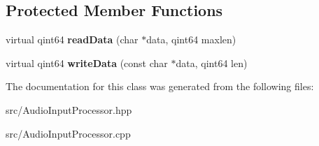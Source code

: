 \subsection*{Protected Member Functions}
\begin{DoxyCompactItemize}
\item 
\hypertarget{classAudioInputProcessor_a4ebabb98105dfb9bdd0192f09b8d82cc}{virtual qint64 {\bfseries read\+Data} (char $\ast$data, qint64 maxlen)}\label{classAudioInputProcessor_a4ebabb98105dfb9bdd0192f09b8d82cc}

\item 
\hypertarget{classAudioInputProcessor_a7e490a617e2f184e971d9c7c9633042e}{virtual qint64 {\bfseries write\+Data} (const char $\ast$data, qint64 len)}\label{classAudioInputProcessor_a7e490a617e2f184e971d9c7c9633042e}

\end{DoxyCompactItemize}


The documentation for this class was generated from the following files\+:\begin{DoxyCompactItemize}
\item 
src/Audio\+Input\+Processor.\+hpp\item 
src/Audio\+Input\+Processor.\+cpp\end{DoxyCompactItemize}
